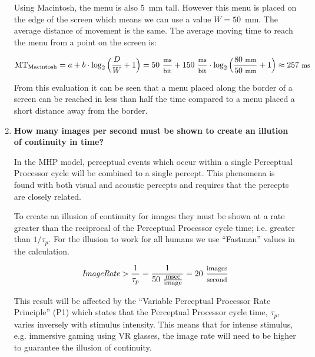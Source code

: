 \begin{enumerate}[label=\alph*)]
Using Macintosh, the menu is also 5~mm tall. However this menu is placed on the edge of the screen which means we can use a value $W = 50$~mm. The average distance of movement is the same. The average moving time to reach the menu from a point on the screen is:

\begin{displaymath}
\text{MT}_\text{Macintosh} = a + b \cdot \log_2\Big(\frac{D}{W} + 1\Big) = 50~{\footnotesize \frac{\text{ms}}{\text{bit}}} + 150~{\footnotesize \frac{\text{ms}}{\text{bit}}} \cdot \log_2\Big(\frac{80~\text{\footnotesize mm}}{50~\text{\footnotesize mm}} + 1\Big) \approx 257~\text{\footnotesize ms}
\end{displaymath}

From this evaluation it can be seen that a menu placed along the border of a screen can be reached in less than half the time compared to a menu placed a short distance away from the border.

\item \textbf{How many images per second must be shown to create an illution of continuity in time?}

In the \ac{MHP} model, perceptual events which occur within a single Perceptual Processor cycle will be combined to a single percept. This phenomena is found with both visual and acoustic percepts and requires that the percepts are closely related.

To create an illusion of continuity for images they must be shown at a rate greater than the reciprocal of the Perceptual Processor cycle time; i.e. greater than $1 / \tau_p$. For the illusion to work for all humans we use ``Fastman'' values in the calculation.

\begin{displaymath}
\textit{ImageRate} > \frac{1}{\tau_p} = \frac{1}{50~\frac{\text{\footnotesize msec}}{\text{\footnotesize image}}} = 20~\frac{\text{\footnotesize images}}{\text{\footnotesize second}}
\end{displaymath}

This result will be affected by the ``Variable Perceptual Processor Rate Principle'' (P1) which states that the Perceptual Processor cycle time, $\tau_p$, varies inversely with stimulus intensity. This means that for intense stimulus, e.g. immersive gaming using \ac{VR} glasses, the image rate will need to be higher to guarantee the illusion of continuity.

\end{enumerate}




